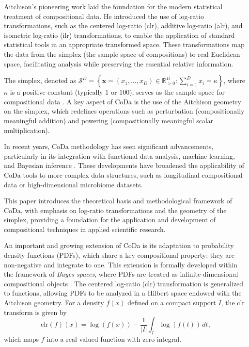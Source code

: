 \documentclass[
	12pt,				%
	oneside,			%
	a4paper,			%
	english,			%
	brazil				%
	]{abntex2ppgsi}
\begin{document}
Aitchison's pioneering work \cite{aitchison1986statistical} laid the foundation for the modern statistical treatment of compositional data. He introduced the use of log-ratio transformations, such as the centered log-ratio (clr), additive log-ratio (alr), and isometric log-ratio (ilr) transformations, to enable the application of standard statistical tools in an appropriate transformed space. These transformations map the data from the simplex (the sample space of compositions) to real Euclidean space, facilitating analysis while preserving the essential relative information.

The simplex, denoted as $\mathcal{S}^D = \left\{ \mathbf{x} = (x_1, \ldots, x_D) \in \mathbb{R}^D_{>0} : \sum_{i=1}^D x_i = \kappa \right\}$, where $\kappa$ is a positive constant (typically 1 or 100), serves as the sample space for compositional data \cite{egozcue2003isometric}. A key aspect of CoDa is the use of the Aitchison geometry on the simplex, which redefines operations such as perturbation (compositionally meaningful addition) and powering (compositionally meaningful scalar multiplication).

In recent years, CoDa methodology has seen significant advancements, particularly in its integration with functional data analysis, machine learning, and Bayesian inference \cite{van2013analyzing,greenacre2018compositional}. These developments have broadened the applicability of CoDa tools to more complex data structures, such as longitudinal compositional data or high-dimensional microbiome datasets.

This paper introduces the theoretical basis and methodological framework of CoDa, with emphasis on log-ratio transformations and the geometry of the simplex, providing a foundation for the application and development of compositional techniques in applied scientific research.


An important and growing extension of CoDa is its adaptation to probability density functions (PDFs), which share a key compositional property: they are non-negative and integrate to one. This extension is formally developed within the framework of \textit{Bayes spaces}, where PDFs are treated as infinite-dimensional compositional objects \cite{egozcue2006hilbert}. The centered log-ratio (clr) transformation is generalized to functions, allowing PDFs to be analyzed in a Hilbert space endowed with the Aitchison geometry. For a density $f(x)$ defined on a compact support $I$, the clr transform is given by
\[
\text{clr}(f)(x) = \log(f(x)) - \frac{1}{|I|} \int_I \log(f(t))\,dt,
\]
which maps $f$ into a real-valued function with zero integral.
\end{document}

